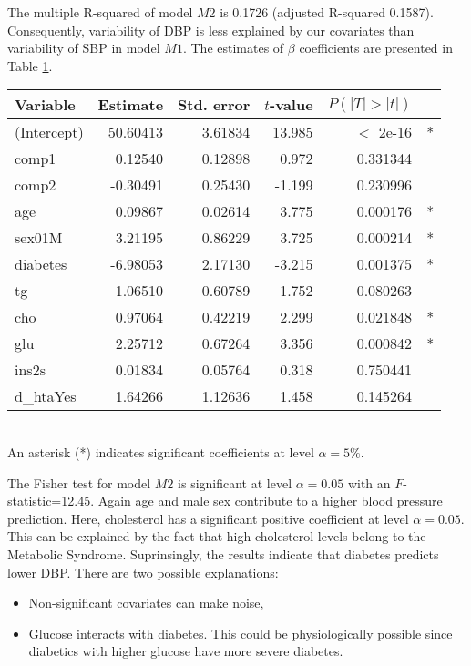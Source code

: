 The multiple R-squared of model $M2$ is 0.1726 (adjusted R-squared 0.1587). Consequently, variability of DBP is less explained by our covariates than variability of SBP in model $M1$. The estimates of $\beta$ coefficients are presented in Table \ref{table:betasm2}.

\begin{table}
\centering
{}
\begin{tabular}{lrrrrl}
\toprule
Variable & Estimate & Std. error & $t$-value & $P(|T|>|t|)$& \\
\midrule
(Intercept)& 50.60413  &  3.61834 & 13.985 & $<$ 2e-16&* \\
comp1      &  0.12540 &   0.12898  & 0.972& 0.331344 & \\  
comp2    &   -0.30491   & 0.25430&  -1.199 &0.230996  & \\  
age        &  0.09867 &   0.02614 & 3.775& 0.000176&* \\
sex01M    &  3.21195  &  0.86229 &  3.725 &0.000214&*  \\
diabetes  &  -6.98053  & 2.17130 & -3.215& 0.001375&*  \\ 
tg       &    1.06510  &  0.60789 &  1.752& 0.080263 &\\ 
cho     &     0.97064 &   0.42219 &  2.299 &0.021848&*  \\
glu       &   2.25712  &  0.67264   &3.356& 0.000842&* \\
ins2s       & 0.01834  &  0.05764&   0.318 &0.750441  & \\  
d\_htaYes    & 1.64266  &  1.12636 &  1.458& 0.145264  & \\  
\bottomrule
\end{tabular}
\label{table:betasm2} \\
{\footnotesize An asterisk (*) indicates significant coefficients at level $\alpha=5\%$.}
\end{table}

The Fisher test for model $M2$ is significant at level $\alpha=0.05$ with an $F$-statistic=12.45. Again age and male sex contribute to a higher blood pressure prediction. Here, cholesterol has a significant positive coefficient at level $\alpha=0.05$. This can be explained by the fact that high cholesterol levels belong to the Metabolic Syndrome. Suprinsingly, the results indicate that diabetes predicts lower DBP. There are two possible explanations:
\begin{itemize}
\item Non-significant covariates can make noise,
\item Glucose interacts with diabetes. This could be physiologically possible since diabetics with higher glucose have more severe diabetes.
\end{itemize}


